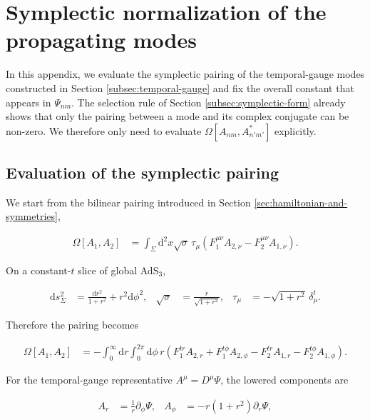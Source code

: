 \section{Symplectic normalization of the propagating modes}\label{app:symplectic-normalization}

In this appendix, we evaluate the symplectic pairing of the temporal-gauge modes constructed in Section \ref{subsec:temporal-gauge} and fix the overall constant that appears in $\Psi_{nm}$. The selection rule of Section \ref{subsec:symplectic-form} already shows that only the pairing between a mode and its complex conjugate can be non-zero. We therefore only need to evaluate $\Omega[A_{nm},A_{n'm'}^{*}]$ explicitly.

\subsection{Evaluation of the symplectic pairing}\label{app:symplectic-pairing-evaluation}

We start from the bilinear pairing introduced in Section \ref{sec:hamiltonian-and-symmetries},

\begin{align}
\Omega[A_{1},A_{2}]&=\int_{\Sigma}\mathrm{d}^{2}x\sqrt{\sigma}\,\tau_{\mu}\left(F_{1}^{\mu\nu}A_{2,\nu}-F_{2}^{\mu\nu}A_{1,\nu}\right).
\end{align}

On a constant-$t$ slice of global AdS$_3$,

\begin{align}
\mathrm{d}s_{\Sigma}^{2}&=\frac{\mathrm{d}r^{2}}{1+r^{2}}+r^{2}\mathrm{d}\phi^{2}, &
\sqrt{\sigma}&=\frac{r}{\sqrt{1+r^{2}}}, &
\tau_{\mu}&=-\sqrt{1+r^{2}}\,\delta_{\mu}^{t}.
\end{align}

Therefore the pairing becomes

\begin{align}
\Omega[A_{1},A_{2}]&=-\int_{0}^{\infty}\mathrm{d}r\int_{0}^{2\pi}\mathrm{d}\phi\,r\left(F_{1}^{tr}A_{2,r}+F_{1}^{t\phi}A_{2,\phi}-F_{2}^{tr}A_{1,r}-F_{2}^{t\phi}A_{1,\phi}\right).
\end{align}

For the temporal-gauge representative $A^{\mu}=D^{\mu}\Psi$, the lowered components are

\begin{align}
A_{r}&=\frac{1}{r}\partial_{\phi}\Psi, &
A_{\phi}&=-r(1+r^{2})\partial_{r}\Psi,
\end{align}

